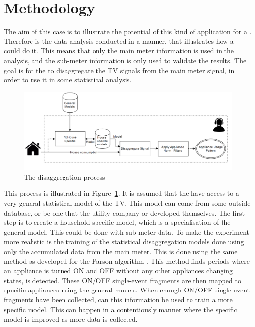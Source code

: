 \section{Methodology}
The aim of this case is to illustrate the potential of this kind of application for a . Therefore is the data analysis conducted in a manner, that illustrates how a  could do it. This means that only the main meter information is used in the analysis, and the sub-meter information is only used to validate the results.  The goal is for the  to disaggregate the TV signals from the main meter signal, in order to use it in some statistical analysis. 

\begin{figure}[H]
\centering
\includegraphics[width=1\textwidth]{billeder/Electric company method.png}
\caption{The disaggregation process}
\label{fig:ECM}
\end{figure}

This process is illustrated in Figure~\ref{fig:ECM}. It is assumed that the  have access to a very general statistical model of the TV. This model can come from some outside database, or be one that the utility company or  developed themselves. The first step is to create a household specific model, which is a specialisation of the general model. This could be done with sub-meter data. To make the experiment more realistic is the training of the statistical disaggregation models done using only the accumulated data from the main meter. This is done using the same method as developed for the Parson algorithm \citep{RefWorks:28}. This method finds periods where an appliance is turned ON and OFF without any other appliances changing states, is detected. These ON/OFF single-event fragments are then mapped to specific appliances using the general models. When enough ON/OFF single-event fragments have been collected, can this information be used to train a more specific model. This can happen in a contentiously manner where the specific model is improved as more data is collected.  

